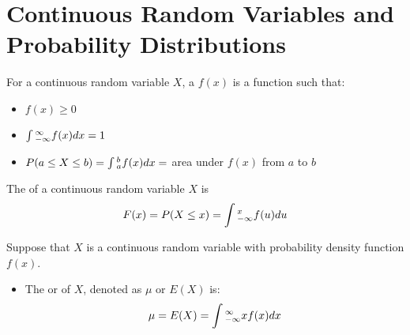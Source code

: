 \chapter{Continuous Random Variables and Probability Distributions}

  \par For a continuous random variable $X$, a  $f(x)$ is a function such that:
    \begin{itemize}
      \item $f(x) \geq 0$
      \item $\int \limits{_{-\infty}^{\infty}} f(x)dx = 1$
      \item $P(a \leq X \leq b) = \int \limits{_{a}^{b}} f(x)dx = $ area under $f(x)$
        from $a$ to $b$
    \end{itemize}

  \par The  of a continuous random
    variable $X$ is
    \[
      F(x) = P(X \leq x) = \int \limits{_{-\infty}^{x}} f(u)du
    \]

    \par Suppose that $X$ is a continuous random variable with probability
      density function $f(x)$.
      \begin{itemize}
        \item The  or  of $X$, denoted as $\mu$ or
          $E(X)$ is:
          \[
            \mu = E(X) = \int \limits{_{-\infty}^{\infty}} x f(x) dx
          \]
      \end{itemize}
